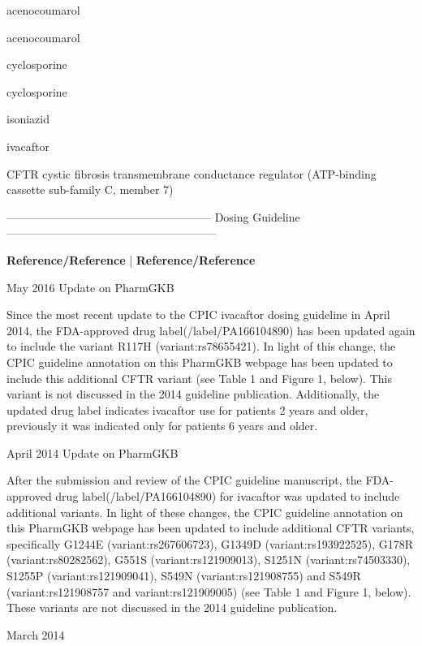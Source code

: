 \documentclass{resume} %
\begin{document}
\begin{rSection}{ acenocoumarol }
\begin{rSection}{ acenocoumarol }
\begin{rSection}{ cyclosporine }
\begin{rSection}{ cyclosporine }
\begin{rSection}{ isoniazid }
\end{rSection}\begin{rSection}{ ivacaftor }
\item[]
\begin{rSubsection}{ CFTR }{ cystic fibrosis transmembrane conductance regulator (ATP-binding cassette sub-family C, member 7) }{}{}
\item[]
\item[] ------------------------------------------------------ Dosing Guideline --------------------------------------------------------\newline
\item[]
\item[] \textbf{ Reference/Reference } | \textbf{ Reference/Reference }
\item May 2016 Update on PharmGKB
 \newline
\item Since the most recent update to the CPIC ivacaftor dosing guideline in April 2014, the FDA-approved drug label(/label/PA166104890) has been updated again to include the variant R117H (variant:rs78655421). In light of this change, the CPIC guideline annotation on this PharmGKB webpage has been updated to include this additional CFTR variant (see Table 1 and Figure 1, below). This variant is not discussed in the 2014 guideline publication. Additionally, the updated drug label indicates ivacaftor use for patients 2 years and older,  previously it was indicated only for patients 6 years and older. 
 \newline
\item April 2014 Update on PharmGKB
 \newline
\item After the submission and review of the CPIC guideline manuscript, the FDA-approved drug label(/label/PA166104890) for ivacaftor was updated to include additional variants. In light of these changes, the CPIC guideline annotation on this PharmGKB webpage has been updated to include additional CFTR variants, specifically G1244E (variant:rs267606723), G1349D (variant:rs193922525), G178R (variant:rs80282562), G551S (variant:rs121909013), S1251N (variant:rs74503330), S1255P (variant:rs121909041), S549N (variant:rs121908755) and S549R (variant:rs121908757 and variant:rs121909005) (see Table 1 and Figure 1, below).  These variants are not discussed in the 2014 guideline publication.
 \newline
\item March 2014
 \newline

\end{rSubsection}
\end{rSection}
\end{rSection}
\end{rSection}
\end{rSection}
\end{rSection}
\end{document}
